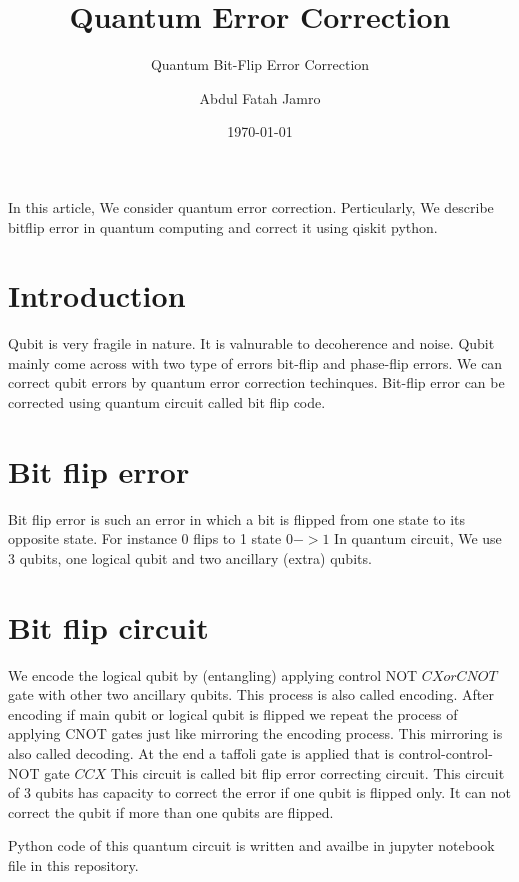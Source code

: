 \documentclass[a4paper, 12pt]{scrartcl}
\title{Quantum Error Correction}
\subtitle{Quantum Bit-Flip Error Correction}
\author{Abdul Fatah Jamro}
\date{\today}
\begin{document}
\maketitle
  In this article, We consider quantum error correction. 
  Perticularly, We describe bitflip error in quantum computing 
  and correct it using qiskit python.

\section{Introduction}
  Qubit is very fragile in nature. It is valnurable to decoherence and noise.
  Qubit mainly come across with two type of errors bit-flip and phase-flip errors.
  We can correct qubit errors by quantum error correction techinques. 
  Bit-flip error can be corrected using quantum circuit called bit flip code.

  \section{Bit flip error}
  Bit flip error is such an error in which a bit is flipped from one state to 
  its opposite state. For instance 0 flips to 1 state $0  -> 1$
  In quantum circuit, We use 3 qubits, one logical qubit and two ancillary (extra) qubits.
\section{Bit flip circuit}
  We encode the logical qubit by (entangling) applying control NOT $CX or CNOT$ gate with other two ancillary qubits.
  This process is also called encoding. After encoding if main qubit or logical qubit is flipped
  we repeat the process of applying CNOT gates just like mirroring the encoding process.
  This mirroring is also called decoding. At the end a taffoli gate is applied that is control-control-NOT gate $CCX$
  This circuit is called bit flip error correcting circuit. This circuit of 3 qubits has capacity 
  to correct the error if one qubit is flipped only. It can not correct the qubit if
  more than one qubits are flipped.

  Python code of this quantum circuit is written and availbe in jupyter notebook file in this repository.
\end{document}
